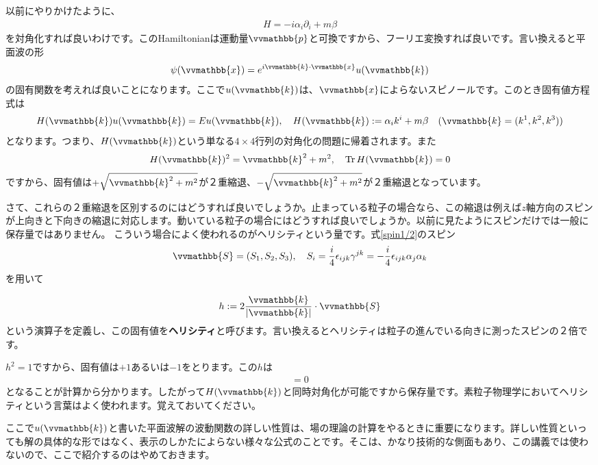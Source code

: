\documentclass[report,paper=a4, fontsize=12pt, line_length=16cm, number_of_lines=33,dvipdfmx]{jlreq}
\newenvironment{important}{\begin{tcolorbox}[
  colback = white,
  colframe = red!35,
  boxrule = 2mm,
  fonttitle = \bfseries,
  after = \noindent] }{\end{tcolorbox}}
\numberwithin{equation}{chapter}
\newcommand{\del}{\partial}
\newcommand{\strong}[1]{{\sffamily \bfseries #1}}
\newcommand{\xb}{\vvmathbb{x}}
\newcommand{\kb}{\vvmathbb{k}}
\newcommand{\pbb}{\vvmathbb{p}}
\newcommand{\Sb}{\vvmathbb{S}}
\begin{document}
以前にやりかけたように、
\begin{align}
  H=-i\alpha_{i}\del_{i}+m\beta
\end{align}
を対角化すれば良いわけです。このHamiltonianは運動量$\pbb$と可換ですから、フーリエ変換すれば良いです。言い換えると平面波の形
\begin{align}
  \psi(\xb)=e^{i\kb\cdot \xb}u(\kb)
\end{align}
の固有関数を考えれば良いことになります。ここで$u(\kb)$は、$\xb$によらないスピノールです。このとき固有値方程式は
\begin{align}
  H(\kb)u(\kb)=Eu(\kb),\quad H(\kb):=\alpha_ik^{i} +m\beta\quad (\kb=(k^1,k^2,k^3))
\end{align}
となります。つまり、$H(\kb)$という単なる$4\times 4$行列の対角化の問題に帰着されます。また
\begin{align}
  H(\kb)^2=\kb^2+m^2,\quad \Tr H(\kb) =0
\end{align}
ですから、固有値は$+\sqrt{\kb^2+m^2}$が２重縮退、$-\sqrt{\kb^2+m^2}$が２重縮退となっています。

さて、これらの２重縮退を区別するのにはどうすれば良いでしょうか。止まっている粒子の場合なら、この縮退は例えば$z$軸方向のスピンが上向きと下向きの縮退に対応します。動いている粒子の場合にはどうすれば良いでしょうか。以前に見たようにスピンだけでは一般に保存量ではありません。
こういう場合によく使われるのがヘリシティという量です。式\eqref{spin1/2}のスピン
\begin{align}
  \Sb=(S_1,S_2,S_3),\quad 
  S_i=\frac{i}{4}\epsilon_{ijk}\gamma^{jk}=-\frac{i}{4}\epsilon_{ijk}\alpha_{j}\alpha_{k}
\end{align}
を用いて
\begin{important}
  \begin{align}
    h:=2\frac{\kb}{|\kb|} \cdot \Sb
  \end{align}
  という演算子を定義し、この固有値を\strong{ヘリシティ}と呼びます。言い換えるとヘリシティは粒子の進んでいる向きに測ったスピンの２倍です。  
\end{important}
$h^2=1$ですから、固有値は$+1$あるいは$-1$をとります。この$h$は
\begin{align}
  [H(\kb),h]=0
\end{align}
となることが計算から分かります。したがって$H(\kb)$と同時対角化が可能ですから保存量です。素粒子物理学においてヘリシティという言葉はよく使われます。覚えておいてください。

ここで$u(\kb)$と書いた平面波解の波動関数の詳しい性質は、場の理論の計算をやるときに重要になります。詳しい性質といっても解の具体的な形ではなく、表示のしかたによらない様々な公式のことです。そこは、かなり技術的な側面もあり、この講義では使わないので、ここで紹介するのはやめておきます。
\end{document}
